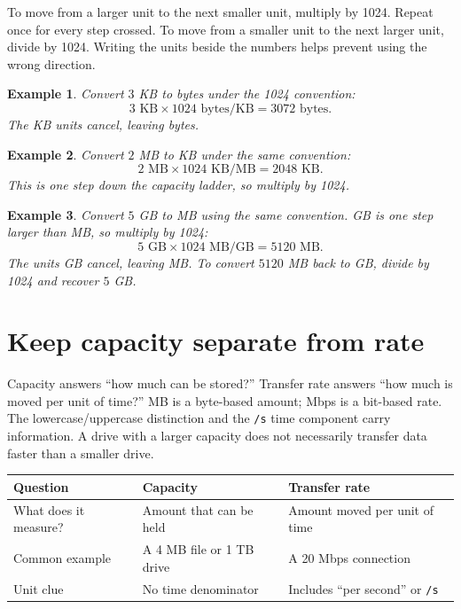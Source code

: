 \documentclass[11pt]{article}
\newtheorem{example}{Example}[section]
\begin{document}
To move from a larger unit to the next smaller unit, multiply by 1024.
Repeat once for every step crossed. To move from a smaller unit to the next
larger unit, divide by 1024. Writing the units beside the numbers helps
prevent using the wrong direction.

\begin{example}
Convert $3$ KB to bytes under the 1024 convention:
\[
3\text{ KB}\times 1024\text{ bytes/KB}=3072\text{ bytes}.
\]
The KB units cancel, leaving bytes.
\end{example}

\begin{example}
Convert $2$ MB to KB under the same convention:
\[
2\text{ MB}\times 1024\text{ KB/MB}=2048\text{ KB}.
\]
This is one step down the capacity ladder, so multiply by 1024.
\end{example}

\begin{example}
Convert $5$ GB to MB using the same convention. GB is one step larger than
MB, so multiply by 1024:
\[
  5\text{ GB}\times 1024\text{ MB/GB}=5120\text{ MB}.
\]
The units GB cancel, leaving MB. To convert $5120$ MB back to GB, divide by
1024 and recover $5$ GB.
\end{example}

\section{Keep capacity separate from rate}
Capacity answers ``how much can be stored?'' Transfer rate answers ``how
much is moved per unit of time?'' MB is a byte-based amount; Mbps is a
bit-based rate. The lowercase/uppercase distinction and the \texttt{/s}
time component carry information. A drive with a larger capacity does not
necessarily transfer data faster than a smaller drive.

\begin{center}
\begin{tabular}{p{}p{}p{}}
\toprule
\textbf{Question} & \textbf{Capacity} & \textbf{Transfer rate}\\
\midrule
What does it measure? & Amount that can be held & Amount moved per unit of time\\
Common example & A 4 MB file or 1 TB drive & A 20 Mbps connection\\
Unit clue & No time denominator & Includes ``per second'' or \texttt{/s}\\
\bottomrule
\end{tabular}
\end{center}
\end{document}
